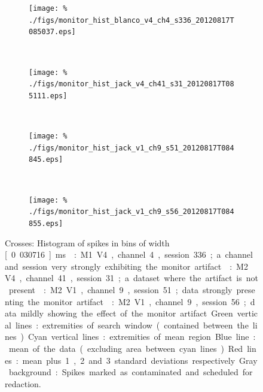 \begin{figure}[htbp]
    \begin{subfigure}[b]{0.5\linewidth}
        \centering
        \caption{\small{}}
        \label{fig:mahist-b4}
        \texttt{[image: \%
./figs/monitor\_hist\_blanco\_v4\_ch4\_s336\_20120817T085037.eps]}
    \end{subfigure}
    ~~
    \begin{subfigure}[b]{0.5\linewidth}
        \centering
        \caption{\small{}}
        \label{fig:mahist-j4}
        \texttt{[image: \%
./figs/monitor\_hist\_jack\_v4\_ch41\_s31\_20120817T085111.eps]}
    \end{subfigure}
    \\
    \begin{subfigure}[b]{0.5\linewidth}
        \centering
        \caption{\small{}}
        \label{fig:mahist-j1s51}
        \texttt{[image: \%
./figs/monitor\_hist\_jack\_v1\_ch9\_s51\_20120817T084845.eps]}
    \end{subfigure}
    ~~
    \begin{subfigure}[b]{0.5\linewidth}
        \centering
        \caption{\small{}}
        \label{fig:mahist-j1s56}
        \texttt{[image: \%
./figs/monitor\_hist\_jack\_v1\_ch9\_s56\_20120817T084855.eps]}
    \end{subfigure}
    \caption{\small{}Crosses: Histogram of spikes in bins of width \unit[0.030716]{ms}.
: M1 V4, channel 4, session 336; a channel and session very strongly exhibiting the monitor artifact.
: M2 V4, channel 41, session 31; a dataset where the artifact is not present.
: M2 V1, channel 9, session 51; data strongly presenting the monitor artifact.
: M2 V1, channel 9, session 56; data mildly showing the effect of the monitor artifact.
Green vertical lines: extremities of search window (contained between the lines).
Cyan vertical lines: extremities of mean region.
Blue line: mean of the data (excluding area between cyan lines).
Red lines: mean plus 1, 2 and 3 standard deviations respectively.
Gray background: Spikes marked as contaminated and scheduled for redaction.
}
    \label{fig:mahist}
\end{figure}


